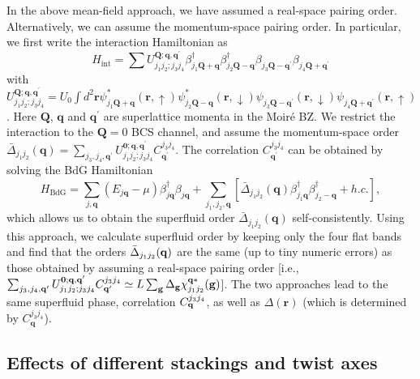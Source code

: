 \documentclass[twocolumn,english,prl,floatfix,citeautoscript,nofootinbib]{revtex4}
\begin{document}
\begin{widetext}
In the above mean-field approach, we have assumed a real-space pairing
order. Alternatively, we can assume the momentum-space pairing order. In
particular, we first write the interaction Hamiltonian as
\[
H_{\text{int}}=\sum U_{j_{1}j_{2};j_{3}j_{4}}^{\mathbf{Q;q,q^{\prime }}%
}\beta _{j_{1}\mathbf{Q+q}}^{\dag }\beta _{j_{2}\mathbf{Q-q}}^{\dag }\beta
_{j_{3}\mathbf{Q-q^{\prime }}}\beta _{j_{4}\mathbf{Q+q^{\prime }}}
\]%
with $U_{j_{1}j_{2};j_{3}j_{4}}^{\mathbf{Q;q,q^{\prime }}}=U_{0}\int d^{2}%
\mathbf{r}\psi _{j_{1}\mathbf{Q+q}}^{\ast }(\mathbf{r},\uparrow )\psi _{j_{2}%
\mathbf{Q-q}}^{\ast }(\mathbf{r},\downarrow )\psi _{j_{3}\mathbf{Q-q^{\prime
}}}(\mathbf{r},\downarrow )\psi _{j_{4}\mathbf{Q+q^{\prime }}}(\mathbf{r}%
,\uparrow )$. Here $\mathbf{Q}$, $\mathbf{q}$ and $\mathbf{q^{\prime }}$ are
superlattice momenta in the Moir\'{e} BZ. We restrict the interaction to the
$\mathbf{Q}=0$ BCS channel, and assume the momentum-space order $\bar{\Delta}%
_{j_{1}j_{2}}(\mathbf{q})=\sum_{j_{3},j_{4},\mathbf{q}^{\prime
}}U_{j_{1}j_{2};j_{3}j_{4}}^{\mathbf{0;q,q^{\prime }}}C_{\mathbf{q}^{\prime
}}^{j_{3}j_{4}}$. The correlation $C_{\mathbf{q}^{\prime }}^{j_{3}j_{4}}$
can be obtained by solving the BdG Hamiltonian%
\begin{equation}
H_{\text{BdG}}=\sum_{j,\mathbf{q}}(E_{j\mathbf{q}}-\mu)\beta _{j\mathbf{q}}^{\dag
}\beta _{j\mathbf{q}}+\sum_{j_{1},j_{2},\mathbf{q}}[\bar{\Delta}%
_{j_{1}j_{2}}(\mathbf{q})\beta _{j_{1}\mathbf{q}}^{\dag }\beta _{j_{2}-%
\mathbf{q}}^{\dag }+h.c.],
\end{equation}%
which allows us to obtain the superfluid order $\bar{\Delta}_{j_{1}j_{2}}(%
\mathbf{q})$ self-consistently. Using this approach, we calculate superfluid
order by keeping only the four flat bands and find that the orders $\bar{%
\Delta}_{j_{1}j_{2}}(\mathbf{q})$ are the same (up to tiny numeric errors)
as those obtained by assuming a real-space pairing order [i.e., $%
\sum_{j_{3},j_{4},\mathbf{q}^{\prime }}U_{j_{1}j_{2};j_{3}j_{4}}^{\mathbf{%
0;q,q^{\prime }}}C_{\mathbf{q}^{\prime }}^{j_{3}j_{4}}\simeq L\sum_{\mathbf{g%
}}\Delta _{\mathbf{g}}\chi _{j_{1}j_{2}}^{\mathbf{q}\ast }(\mathbf{g})$].
The two approaches lead to the same superfluid phase, correlation $C_{%
\mathbf{q}}^{j_{3}j_{4}}$, as well as $\Delta (\mathbf{r})$ (which is
determined by $C_{\mathbf{q}}^{j_{3}j_{4}}$).

\subsection{Effects of different stackings and twist axes}


\end{widetext}
\end{document}
